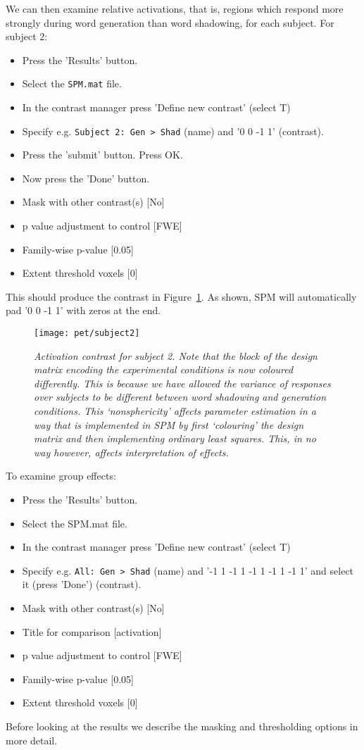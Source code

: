 We can then examine relative activations, that is, regions which respond more strongly during word generation than word shadowing, for each subject. For subject 2:
\begin{itemize}
\item{Press the 'Results' button.}
\item{Select the \texttt{SPM.mat} file.}
\item{In the contrast manager press 'Define new contrast' (select T)}
\item{Specify e.g. \verb!Subject 2: Gen > Shad! (name) and '0 0 -1 1' (contrast).}
\item{Press the 'submit' button. Press OK.}
\item{Now press the 'Done' button.}
\item{Mask with other contrast(s) [No]}
\item{p value adjustment to control [FWE]}
\item{Family-wise p-value [0.05]}
\item{Extent threshold {voxels} [0]}
\end{itemize}
This should produce the contrast in Figure~\ref{subject2}. As shown, SPM will automatically pad '0 0 -1 1' with zeros
at the end.
\begin{figure}
\begin{center}
\texttt{[image: pet/subject2]}
\caption{\em Activation contrast for subject 2. Note that the block of the design matrix encoding the experimental conditions is now coloured differently. This is because we have allowed the variance of responses over subjects to be different between word shadowing and generation conditions. This `nonsphericity' affects parameter estimation in a way that is implemented in SPM by first `colouring' the design matrix and then implementing ordinary least squares. This, in no way however, affects interpretation of effects.  \label{subject2}}
\end{center}
\end{figure}
To examine group effects:
\begin{itemize}
\item{Press the 'Results' button.}
\item{Select the SPM.mat file.}
\item{In the contrast manager press 'Define new contrast' (select T)}
\item{Specify e.g. \verb!All: Gen > Shad! (name) and  '-1 1 -1 1 -1 1 -1 1 -1 1' and select it (press 'Done') (contrast).}
\item{Mask with other contrast(s) [No]}
\item{Title for comparison [activation]}
\item{p value adjustment to control [FWE]}
\item{Family-wise p-value [0.05]}
\item{Extent threshold {voxels} [0]}
\end{itemize}
Before looking at the results we describe the
masking and thresholding options in more detail.

